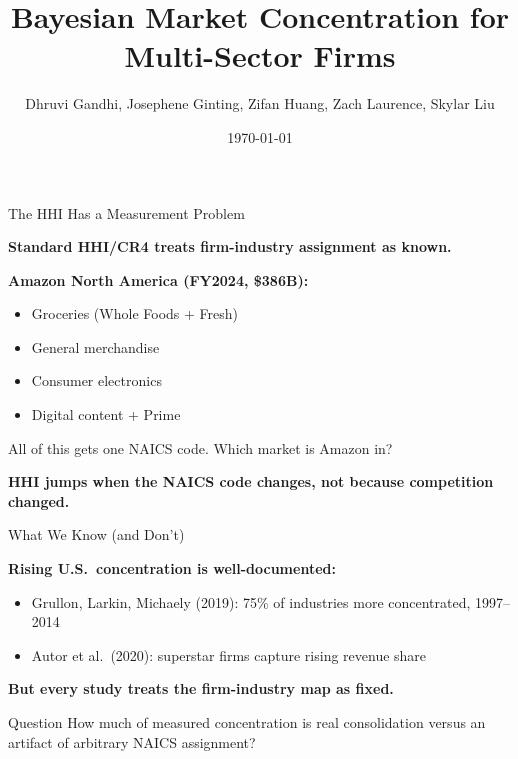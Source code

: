 \documentclass[aspectratio=169]{beamer}
\title{Bayesian Market Concentration for Multi-Sector Firms}
\author{Dhruvi Gandhi, Josephene Ginting, Zifan Huang, Zach Laurence, Skylar Liu}
\date{\today}
\institute{University of Chicago}
\begin{document}
\begin{frame}[plain]
  \titlepage
\end{frame}


\begin{frame}{The HHI Has a Measurement Problem}

  \textbf{Standard HHI/CR4 treats firm-industry assignment as known.}

  \vspace{1em}

  \textbf{Amazon North America (FY2024, \$386B):}
  \begin{itemize}
    \item Groceries (Whole Foods + Fresh)
    \item General merchandise
    \item Consumer electronics
    \item Digital content + Prime
  \end{itemize}

  \vspace{1em}

  All of this gets one NAICS code. Which market is Amazon in?

  \vfill
  \textbf{HHI jumps when the NAICS code changes, not because competition changed.}

\end{frame}

\begin{frame}{What We Know (and Don't)}

  \textbf{Rising U.S.\ concentration is well-documented:}
  \begin{itemize}
    \item Grullon, Larkin, Michaely (2019): 75\% of industries more concentrated, 1997--2014
    \item Autor et al.\ (2020): superstar firms capture rising revenue share
  \end{itemize}

  \vspace{1em}

  \textbf{But every study treats the firm-industry map as fixed.}

  \vspace{1em}

  \begin{block}{Question}
    How much of measured concentration is real consolidation versus an artifact of arbitrary NAICS assignment?
  \end{block}

\end{frame}
\end{document}
